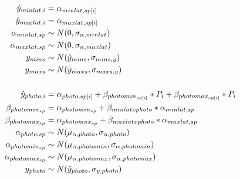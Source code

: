 \documentclass[11pt,letter]{article}
\begin{document}

\renewcommand{\refname}{\CHead{}}


\begin{align*}
\hat{y}_{minlat, i} &= \alpha_{minlat, sp[i]}\\
\hat{y}_{maxlat, i} &= \alpha_{maxlat, sp[i]}\\
\alpha_{minlat, sp} & \sim N(0, \sigma_{\alpha, minlat}) \\
\alpha_{maxlat, sp} & \sim N(0, \sigma_{\alpha, maxlat}) \\
y_{mins}& \sim N(\hat{y}_{mins},\sigma_{mins, y}) \\
y_{maxs}& \sim N(\hat{y}_{maxs},\sigma_{maxs, y}) \\
\vspace{1ex}\\
\hat{y}_{photo, i} &= \alpha_{photo, sp[i]} + \beta_{photomin_{sp[i]}}*P_i + \beta_{photomax_{sp[i]}}*P_i\\
\beta_{photomin_{sp}} & = \alpha_{photomin_{sp}} + \beta_{minlat x photo}*\alpha_{minlat,sp}\\
\beta_{photomax_{sp}} & = \alpha_{photomax_{sp}} + \beta_{maxlat x photo}*\alpha_{maxlat,sp}\\
\alpha_{photo, sp} & \sim N(\mu_{\alpha, photo}, \sigma_{\alpha, photo}) \\
\alpha_{photomin_{sp}} & \sim N(\mu_{\alpha, photomin}, \sigma_{\alpha, photomin})\\
\alpha_{photomax_{sp}} & \sim N(\mu_{\alpha, photomax}, \sigma_{\alpha, photomax})\\
y_{photo} & \sim N(\hat{y}_{photo},\sigma_{y, photo}) 
\end{align*}
\end{document}
